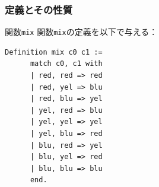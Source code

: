 \documentclass[dvipdfmx,cjk]{beamer}
\def\mix{\textit{mix}}
\def\red{\textit{red}}
\def\blu{\textit{blu}}
\def\yel{\textit{yel}}
\def\mix{\textit{mix}}
\def\mixCut{\textit{mixcut}}
\begin{document}
\begin{frame}[fragile]
  \frametitle{定義とその性質}
  \begin{block}{関数{\tt{mix}}}
    関数{\tt{mix}}の定義を以下で与える：
     \begin{lstlisting}[language=Coq]
      Definition mix c0 c1 :=
      match c0, c1 with
      | red, red => red
      | red, yel => blu
      | red, blu => yel
      | yel, red => blu
      | yel, yel => yel
      | yel, blu => red
      | blu, red => yel
      | blu, yel => red
      | blu, blu => blu
      end.
    \end{lstlisting}
  \end{block}
\end{frame}
\end{document}

